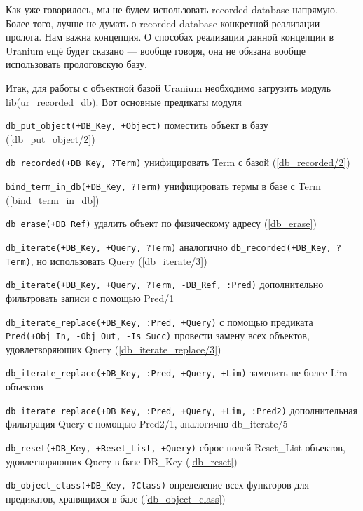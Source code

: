 \documentclass[a4paper]{book}
\def\ur{Uranium}
\begin{document}
Как уже говорилось, мы не будем использовать recorded database
напрямую. Более того, лучше не думать о recorded database
конкретной реализации пролога. Нам важна концепция. О способах
реализации данной концепции в \ur{} ещё будет сказано --- вообще
говоря, она не обязана вообще использовать прологовскую базу.

Итак, для работы с объектной базой \ur{} необходимо загрузить
модуль lib(ur\_recorded\_db). Вот основные предикаты модуля

\begin{description}
\item \verb|db_put_object(+DB_Key, +Object)| поместить объект в
  базу (\ref{db_put_object/2})
\item \verb|db_recorded(+DB_Key, ?Term)| унифицировать Term с
  базой (\ref{db_recorded/2})
\item \verb|bind_term_in_db(+DB_Key, ?Term)| унифицировать термы в
  базе с Term (\ref{bind_term_in_db})

\item \verb|db_erase(+DB_Ref)| удалить объект по физическому
  адресу (\ref{db_erase})

\item \verb|db_iterate(+DB_Key, +Query, ?Term)| аналогично
  \verb|db_recorded(+DB_Key, ?Term)|, но использовать Query
  (\ref{db_iterate/3})
\item \verb|db_iterate(+DB_Key, +Query, ?Term, -DB_Ref, :Pred)|
  дополнительно фильтровать записи с помощью Pred/1
\item \verb|db_iterate_replace(+DB_Key, :Pred, +Query)| с помощью
  предиката \verb|Pred(+Obj_In, -Obj_Out, -Is_Succ)| провести
  замену всех объектов, удовлетворяющих Query
  (\ref{db_iterate_replace/3})
\item \verb|db_iterate_replace(+DB_Key, :Pred, +Query, +Lim)|
  заменить не более Lim объектов
\item
  \verb|db_iterate_replace(+DB_Key, :Pred, +Query, +Lim, :Pred2)|
  дополнительная фильтрация Query с помощью Pred2/1, аналогично
  db\_iterate/5
\item \verb|db_reset(+DB_Key, +Reset_List, +Query)| сброс полей
  Reset\_List объектов, удовлетворяющих Query в базе DB\_Key (\ref{db_reset})

\item \verb|db_object_class(+DB_Key, ?Class)| определение всех
  функторов для предикатов, хранящихся в базе
  (\ref{db_object_class})


\end{description}
\end{document}
